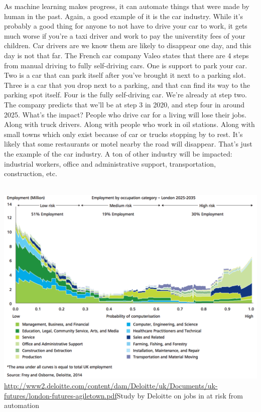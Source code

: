 \documentclass[12pt]{article}
\begin{document}
As machine learning makes progress, it can automate things that were made by human in the past. Again, a good example of it is the car industry. While it's probably a good thing for anyone to not have to drive your car to work, it gets much worse if you're a taxi driver and work to pay the universtity fees of your children. Car drivers are we know them are likely to disappear one day, and this day is not that far.
The French car company Valeo states that there are 4 steps from manual driving to fully self-driving cars. One is support to park your car. Two is a car that can park itself after you've brought it next to a parking slot. Three is a car that you drop next to a parking, and that can find its way to the parking spot itself. Four is the fully self-driving car. We're already at step two. The company predicts that we'll be at step 3 in 2020, and step four in around 2025.
What's the impact? People who drive car for a living will lose their jobs. Along with truck drivers. Along with people who work in oil stations. Along with small towns which only exist because of car or trucks stopping by to rest. It's likely that some restaurants or motel nearby the road will disappear.
That's just the example of the car industry. A ton of other industry will be impacted: industrial workers, office and administrative support, transportation, construction, etc.

\\
\includegraphics[width=\textwidth]{jobs}
\url{http://www2.deloitte.com/content/dam/Deloitte/uk/Documents/uk-futures/london-futures-agiletown.pdf}{Study by Deloitte} on jobs in at risk from automation
\\
\end{document}
